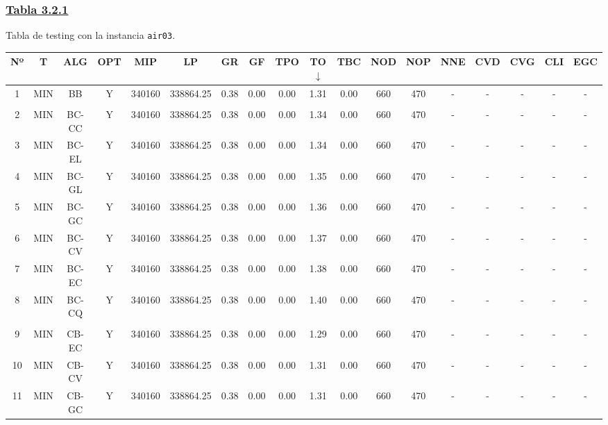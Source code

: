 \setlength{\tabcolsep}{1.5pt}
\subsubsection*{\underline{Tabla 3.2.1}}
\noindent Tabla de testing con la instancia \verb_air03_.\\

{
\footnotesize\centering
\hspace*{-5mm}\begin{tabular}{ *{17}{c|} c }
\hline
\textbf{Nº} & \textbf{T} & \textbf{ALG} & \textbf{OPT} & \textbf{MIP} & \textbf{LP} & \textbf{GR} & \textbf{GF} & \textbf{TPO} & \textbf{TO} $\downarrow$ & \textbf{TBC} & \textbf{NOD} & \textbf{NOP} & \textbf{NNE} & \textbf{CVD} & \textbf{CVG} & \textbf{CLI} & \textbf{EGC}\\
\hline
1 & MIN & BB & Y & 340160 & 338864.25 & 0.38 & 0.00 & 0.00 & 1.31 & 0.00 & 660 & 470 & - & - & - & - & -\\
\hline
\multicolumn{18}{c}{}
\\
\hline
2 & MIN & BC-CC & Y & 340160 & 338864.25 & 0.38 & 0.00 & 0.00 & 1.34 & 0.00 & 660 & 470 & - & - & - & - & -\\
\hline
3 & MIN & BC-EL & Y & 340160 & 338864.25 & 0.38 & 0.00 & 0.00 & 1.34 & 0.00 & 660 & 470 & - & - & - & - & -\\
\hline
4 & MIN & BC-GL & Y & 340160 & 338864.25 & 0.38 & 0.00 & 0.00 & 1.35 & 0.00 & 660 & 470 & - & - & - & - & -\\
\hline
5 & MIN & BC-GC & Y & 340160 & 338864.25 & 0.38 & 0.00 & 0.00 & 1.36 & 0.00 & 660 & 470 & - & - & - & - & -\\
\hline
6 & MIN & BC-CV & Y & 340160 & 338864.25 & 0.38 & 0.00 & 0.00 & 1.37 & 0.00 & 660 & 470 & - & - & - & - & -\\
\hline
7 & MIN & BC-EC & Y & 340160 & 338864.25 & 0.38 & 0.00 & 0.00 & 1.38 & 0.00 & 660 & 470 & - & - & - & - & -\\
\hline
8 & MIN & BC-CQ & Y & 340160 & 338864.25 & 0.38 & 0.00 & 0.00 & 1.40 & 0.00 & 660 & 470 & - & - & - & - & -\\
\hline
\multicolumn{18}{c}{}
\\
\hline
9 & MIN & CB-EC & Y & 340160 & 338864.25 & 0.38 & 0.00 & 0.00 & 1.29 & 0.00 & 660 & 470 & - & - & - & - & -\\
\hline
10 & MIN & CB-CV & Y & 340160 & 338864.25 & 0.38 & 0.00 & 0.00 & 1.31 & 0.00 & 660 & 470 & - & - & - & - & -\\
\hline
11 & MIN & CB-GC & Y & 340160 & 338864.25 & 0.38 & 0.00 & 0.00 & 1.31 & 0.00 & 660 & 470 & - & - & - & - & -\\

\end{tabular}}
